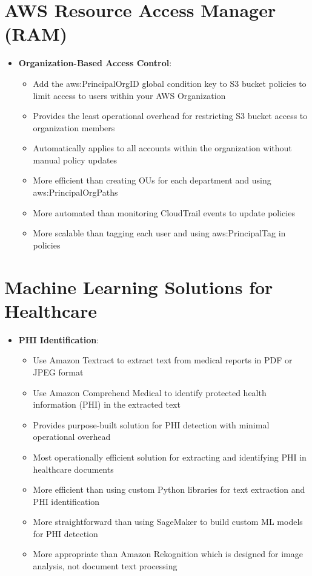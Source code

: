 \documentclass[11pt,a4paper]{report}
\begin{document}
\section{AWS Resource Access Manager (RAM)}

\begin{itemize}
  \item \textbf{Organization-Based Access Control}:
\begin{itemize}
  \item Add the aws:PrincipalOrgID global condition key to S3 bucket policies to limit access to users within your AWS Organization
  \item Provides the least operational overhead for restricting S3 bucket access to organization members
  \item Automatically applies to all accounts within the organization without manual policy updates
  \item More efficient than creating OUs for each department and using aws:PrincipalOrgPaths
  \item More automated than monitoring CloudTrail events to update policies
  \item More scalable than tagging each user and using aws:PrincipalTag in policies
\end{itemize}
\end{itemize}


\section{Machine Learning Solutions for Healthcare}

\begin{itemize}
  \item \textbf{PHI Identification}:
\begin{itemize}
  \item Use Amazon Textract to extract text from medical reports in PDF or JPEG format
  \item Use Amazon Comprehend Medical to identify protected health information (PHI) in the extracted text
  \item Provides purpose-built solution for PHI detection with minimal operational overhead
  \item Most operationally efficient solution for extracting and identifying PHI in healthcare documents
  \item More efficient than using custom Python libraries for text extraction and PHI identification
  \item More straightforward than using SageMaker to build custom ML models for PHI detection
  \item More appropriate than Amazon Rekognition which is designed for image analysis, not document text processing
\end{itemize}
\end{itemize}
\end{document}
